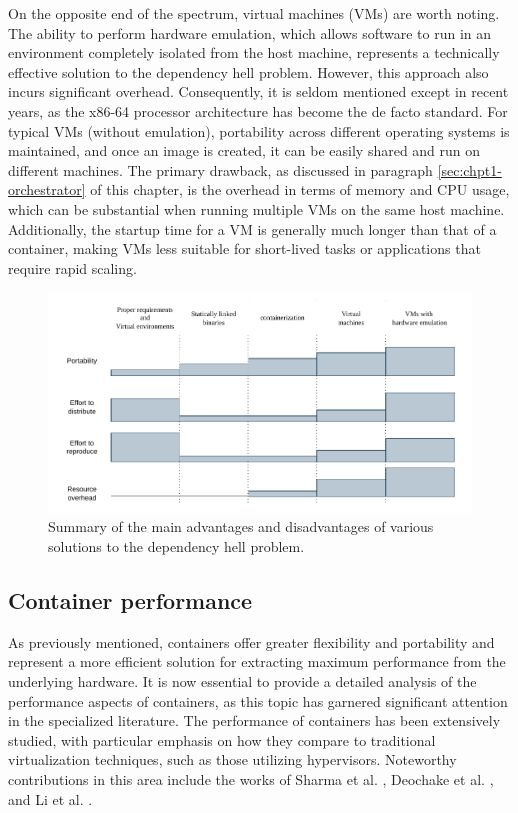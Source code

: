 On the opposite end of the spectrum, virtual machines (VMs) are worth noting.
The ability to perform hardware emulation, which allows software to run in an
environment completely isolated from the host machine, represents a technically
effective solution to the dependency hell problem. However, this approach also
incurs significant overhead. Consequently, it is seldom mentioned except in
recent years, as the x86-64 processor architecture has become the de facto
standard. For typical VMs (without emulation), portability across different
operating systems is maintained, and once an image is created, it can be easily
shared and run on different machines. The primary drawback, as discussed in
paragraph \ref{sec:chpt1-orchestrator} of this chapter, is the overhead in terms
of memory and CPU usage, which can be substantial when running multiple VMs on
the same host machine. Additionally, the startup time for a VM is generally much
longer than that of a container, making VMs less suitable for short-lived tasks
or applications that require rapid scaling.

\begin{figure}[h]
    \centering
    \includegraphics[width=\textwidth]{img/chpt1/solutions-spectrum}
    \caption{Summary of the main advantages and disadvantages of various
      solutions to the dependency hell problem.}
    \label{fig:solspectrum}
\end{figure}


\subsection{Container performance}

As previously mentioned, containers offer greater flexibility and portability
and represent a more efficient solution for extracting maximum performance from
the underlying hardware.
It is now essential to provide a detailed analysis of
the performance aspects of containers, as this topic has garnered significant
attention in the specialized literature.
The performance of containers has been extensively studied, with particular
emphasis on how they compare to traditional virtualization techniques, such as
those utilizing hypervisors.
Noteworthy contributions in this area include the works of Sharma et al.
\cite{Sharma2016}, Deochake et al. \cite{deochake2023}, and Li et al.
\cite{Li2023}.

